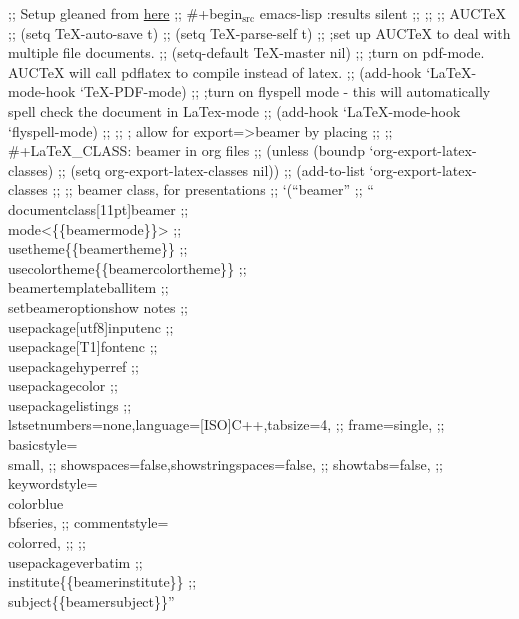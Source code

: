 \documentclass[colorlinks=true,urlcolor=blue,listings-sv]{article}
\begin{document}
  ;;  Setup gleaned from \href{http://salomie.ro/tudor/2010/09/02/console-based-system/}{here}
  ;;  \#+begin$_{\mathrm{src}}$ emacs-lisp :results silent
  ;;  
  ;;  ;; AUCTeX
  ;;  (setq \TeX{}-auto-save t)
  ;;  (setq \TeX{}-parse-self t)
  ;;  ;set up AUCTeX to deal with multiple file documents.
  ;;  (setq-default \TeX{}-master nil)
  ;;  ;turn on pdf-mode.  AUCTeX will call pdflatex to compile instead of latex.
  ;;  (add-hook `LaTeX-mode-hook `TeX-PDF-mode)
  ;;  ;turn on flyspell mode - this will automatically spell check the document in LaTex-mode
  ;;  (add-hook `LaTeX-mode-hook `flyspell-mode)
  ;;  
  ;;      ; allow for export=>beamer by placing
  ;;      ;; \#+\LaTeX{}_CLASS: beamer in org files
  ;;      (unless (boundp `org-export-latex-classes)
  ;;      (setq org-export-latex-classes nil))
  ;;      (add-to-list `org-export-latex-classes
  ;;      ;; beamer class, for presentations
  ;;      `(``beamer''
  ;;        ``\\documentclass[11pt]{beamer}\n
  ;;        \\mode<\{{\{beamermode\}}\}>\n
  ;;        \\usetheme\{{\{{beamertheme\}}\}}\n
  ;;        \\usecolortheme\{{\{{beamercolortheme\}}\}}\n
  ;;        \\beamertemplateballitem\n
  ;;        \\setbeameroption{show notes}
  ;;        \\usepackage[utf8]{inputenc}\n
  ;;        \\usepackage[T1]{fontenc}\n
  ;;        \\usepackage{hyperref}\n
  ;;        \\usepackage{color}
  ;;        \\usepackage{listings}
  ;;        \\lstset{numbers=none,language=[ISO]C++,tabsize=4,
  ;;        frame=single,
  ;;        basicstyle=\\small,
  ;;        showspaces=false,showstringspaces=false,
  ;;        showtabs=false,
  ;;        keywordstyle=\\color{blue}\\bfseries,
  ;;        commentstyle=\\color{red},
  ;;        }\n
  ;;        \\usepackage{verbatim}\n
  ;;        \\institute\{{\{{beamerinstitute\}}\}}\n
  ;;        \\subject\{{\{{beamersubject\}}\}}\n''
\end{document}
